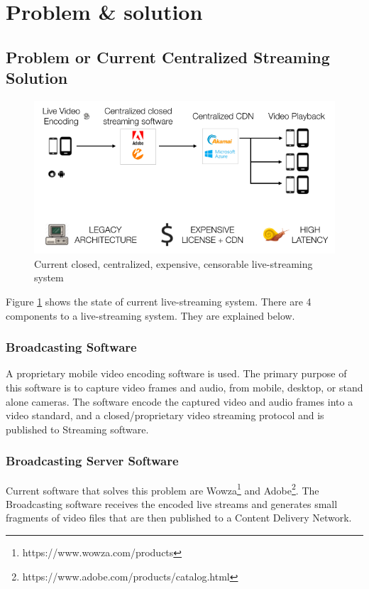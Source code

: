 \documentclass{article}
\begin{document}
\section{Problem \& solution}


\subsection{Problem or Current Centralized Streaming Solution}

\begin{figure}[h!]
  \centering
  \includegraphics[width=1.0\textwidth]{static/problem-architecture}
  \caption{Current closed, centralized, expensive, censorable live-streaming system}
  \label{image:problem-architecture}
\end{figure}

Figure \ref{image:problem-architecture} shows the state of current live-streaming system. There are 4 components to a live-streaming system. They are explained below.
\subsubsection{Broadcasting Software}
A proprietary mobile video encoding software is used. The primary purpose of this software is to capture video frames and audio, from mobile, desktop, or stand alone cameras. The software encode the captured video and audio frames into a video standard, and a closed/proprietary video streaming protocol and is published to Streaming software.

\subsubsection{Broadcasting Server Software}
Current software that solves this problem are Wowza\footnote{https://www.wowza.com/products} and Adobe\footnote{https://www.adobe.com/products/catalog.html}. The Broadcasting software receives the encoded live streams and generates small fragments of video files that are then published to a Content Delivery Network.
\end{document}
